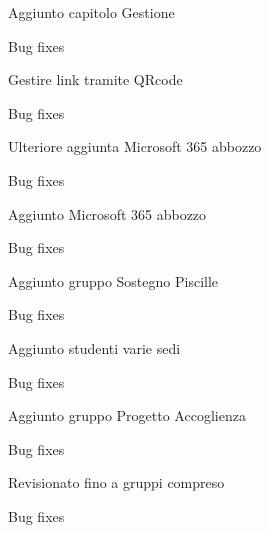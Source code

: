 \begin{changelog}[author=JOHN DOE, sectioncmd=\chapter*]
	\begin{version}[v=1.9.9.7,
		date=2024-05-10]
		\added
		\item Aggiunto capitolo Gestione
		\fixed
		\item Bug fixes
	\end{version}
			\begin{version}[v=1.9.9.6,
		date=2024-05-10]
		\added
		\item Gestire link tramite QRcode
		\fixed
		\item Bug fixes
	\end{version}
				\begin{version}[v=1.9.9.5,
				date=2023-12-30]
				\added
				\item Ulteriore aggiunta  Microsoft 365 abbozzo
				\fixed
				\item Bug fixes
			\end{version}
				\begin{version}[v=1.9.9.4,
		date=2023-12-28]
		\added
		\item Aggiunto Microsoft 365 abbozzo
		\fixed
		\item Bug fixes
	\end{version}
			\begin{version}[v=1.9.9.3,
		date=2023-09-22]
		\added
		\item Aggiunto gruppo Sostegno Piscille
		\fixed
		\item Bug fixes
	\end{version}
		\begin{version}[v=1.9.9.2,
		date=2023-09-20]
		\added
		\item Aggiunto studenti varie sedi
		\fixed
		\item Bug fixes
	\end{version}
		\begin{version}[v=1.9.9.1,
		date=2023-09-07]
		\added
		\item Aggiunto gruppo Progetto Accoglienza
		\fixed
		\item Bug fixes
	\end{version}
	\begin{version}[v=1.9.9,
		date=2023-08-25]
		\added
		\item Revisionato fino a gruppi compreso
		\fixed
		\item Bug fixes

\end{version}
\end{changelog}
